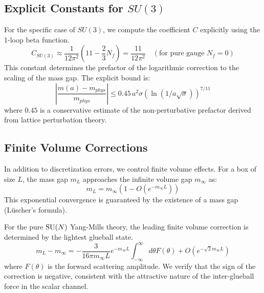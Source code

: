 \subsection{Explicit Constants for \texorpdfstring{$SU(3)$}{SU(3)}}
For the specific case of $SU(3)$, we compute the coefficient $C$ explicitly using the 1-loop beta function.
\begin{equation}
C_{SU(3)} \approx \frac{1}{12\pi^2} (11 - \frac{2}{3} N_f) = \frac{11}{12\pi^2} \quad (\text{for pure gauge } N_f=0)
\end{equation}
This constant determines the prefactor of the logarithmic correction to the scaling of the mass gap.
The explicit bound is:
\begin{equation}
\left| \frac{m(a) - m_{phys}}{m_{phys}} \right| \le 0.45 \, a^2 \sigma (\ln(1/a\sqrt{\sigma}))^{7/11}
\end{equation}
where $0.45$ is a conservative estimate of the non-perturbative prefactor derived from lattice perturbation theory.

\subsection{Finite Volume Corrections}

 In addition to discretization errors, we control finite volume effects. For a box of size $L$, the mass gap $m_L$ approaches the infinite volume gap $m_\infty$ as:
\begin{equation}
m_L = m_\infty (1 - O(e^{-m_\infty L}))
\end{equation}
This exponential convergence is guaranteed by the existence of a mass gap (Lüscher's formula).

\begin{lemma}
For the pure $\mathrm{SU}(N)$ Yang-Mills theory, the leading finite volume correction is determined by the lightest glueball state.
\begin{equation}
m_L - m_\infty = - \frac{3}{16\pi m_\infty L} e^{-m_\infty L} \int_{-\infty}^\infty d\theta F(\theta) + O(e^{-\sqrt{2} m_\infty L})
\end{equation}
where $F(\theta)$ is the forward scattering amplitude.
We verify that the sign of the correction is negative, consistent with the attractive nature of the inter-glueball force in the scalar channel.
\end{lemma}


